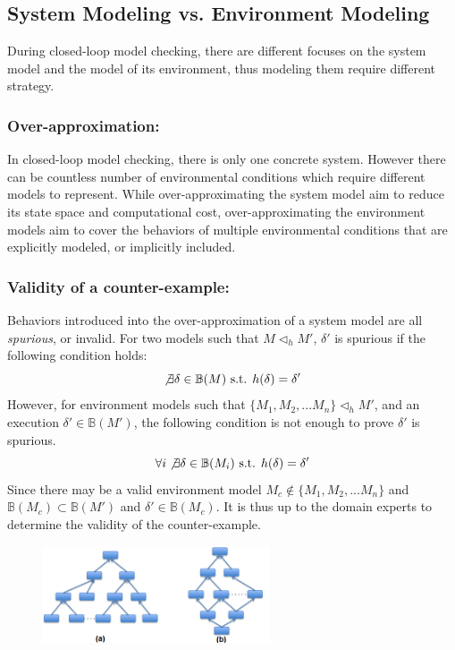 \subsection{System Modeling vs. Environment Modeling}
During closed-loop model checking, there are different focuses on the system model and the model of its environment, thus modeling them require different strategy.
\subsubsection{Over-approximation: }In closed-loop model checking, there is only one concrete system. However there can be countless number of environmental conditions which require different models to represent. While over-approximating the system model aim to reduce its state space and computational cost, over-approximating the environment models aim to cover the behaviors of multiple environmental conditions that are explicitly modeled, or implicitly included. 

\subsubsection{Validity of a counter-example: }Behaviors introduced into the over-approximation of a system model are all \emph{spurious}, or invalid. For two models such that $M\triangleleft_h M'$, $\delta'$ is spurious if the following condition holds: 
$$\not\exists \delta\in\mathbb{B}(M) \text{ s.t. }h(\delta)=\delta'$$
However, for environment models such that $\{M_1,M_2,...M_n\}\triangleleft_h M'$, and an execution $\delta'\in\mathbb{B}(M')$, the following condition is not enough to prove $\delta'$ is spurious.
$$\forall i\not\exists \delta\in\mathbb{B}(M_i)\text{ s.t. }h(\delta)=\delta'$$
Since there may be a valid environment model $M_c\not\in\{M_1,M_2,...M_n\}$ and $\mathbb{B}(M_c)\subset\mathbb{B}(M')$ and $\delta'\in\mathbb{B}(M_c)$. It is thus up to the domain experts to determine the validity of the counter-example.
\begin{figure}[!b]
		\centering
		\includegraphics[width=0.6\textwidth]{figs/env_sys.png}
		\caption{\small }
		\label{fig:distinction}
\end{figure}

